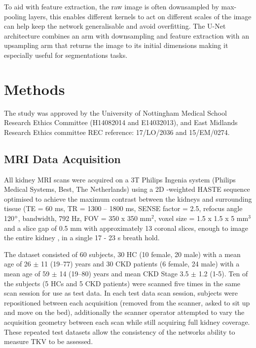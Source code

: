 To aid with feature extraction, the raw image is often downsampled by max-pooling layers, this enables different kernels to act on different scales of the image can help keep the network generalisable and avoid overfitting. The U-Net architecture \cite{ronneberger_u-net_2015} combines an arm with downsampling and feature extraction with an upsampling arm that returns the image to its initial dimensions making it especially useful for segmentations tasks.

\newpage
\section{Methods}
The study was approved by the University of Nottingham Medical School Research Ethics Committee (H14082014 and E14032013), and East Midlands Research Ethics committee REC reference: 17/LO/2036 and 15/EM/0274.

\subsection{MRI Data Acquisition}
\label{sec:ml_methods_acquisition}

All kidney \ac{MRI} scans were acquired on a 3T Philips Ingenia system (Philips Medical Systems, Best, The Netherlands) using a 2D \ttwo-weighted \ac{HASTE} sequence optimised to achieve the maximum contrast between the kidneys and surrounding tissue (\ac{TE} = 60 ms, \ac{TR} = 1300 – 1800 ms, \ac{SENSE} factor = 2.5, refocus angle 120$\degree$, bandwidth, 792 Hz, \ac{FOV} = 350 x 350 mm$^2$, voxel size = 1.5 x 1.5 x 5 mm$^3$ and a slice gap of 0.5 mm with approximately 13 coronal slices, enough to image the entire kidney \cite{petzold_building_2014, will_automated_2014}, in a single 17 - 23 s breath hold.

The dataset consisted of 60 subjects, 30 \ac{HC} (10 female, 20 male) with a mean age of 26 $\pm$ 11 (19–77) years and 30 \ac{CKD} patients (6 female, 24 male) with a mean age of 59 $\pm$ 14 (19–80) years and mean \ac{CKD} Stage 3.5 $\pm$ 1.2 (1-5). Ten of the subjects (5 \ac{HC}s and 5 \ac{CKD} patients) were scanned five times in the same scan session for use as test data. In each test data scan session, subjects were repositioned between each acquisition (removed from the scanner, asked to sit up and move on the bed), additionally the scanner operator attempted to vary the acquisition geometry between each scan while still acquiring full kidney coverage. These repeated test datasets allow the consistency of the networks ability to measure \ac{TKV} to be assessed. 

